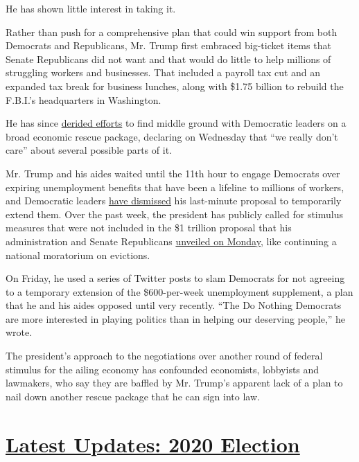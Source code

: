 He has shown little interest in taking it.

Rather than push for a comprehensive plan that could win support from
both Democrats and Republicans, Mr. Trump first embraced big-ticket
items that Senate Republicans did not want and that would do little to
help millions of struggling workers and businesses. That included a
payroll tax cut and an expanded tax break for business lunches, along
with \$1.75 billion to rebuild the F.B.I.'s headquarters in Washington.

He has since
\href{https://www.nytimes3xbfgragh.onion/2020/07/29/business/economy/virus-aid-trump.html?referringSource=articleShare}{derided
efforts} to find middle ground with Democratic leaders on a broad
economic rescue package, declaring on Wednesday that ``we really don't
care'' about several possible parts of it.

Mr. Trump and his aides waited until the 11th hour to engage Democrats
over expiring unemployment benefits that have been a lifeline to
millions of workers, and Democratic leaders
\href{https://www.nytimes3xbfgragh.onion/2020/07/30/us/politics/senate-virus-aid.html}{have
dismissed} his last-minute proposal to temporarily extend them. Over the
past week, the president has publicly called for stimulus measures that
were not included in the \$1 trillion proposal that his administration
and Senate Republicans
\href{https://www.nytimes3xbfgragh.onion/2020/07/27/us/politics/republicans-jobless-aid.html}{unveiled
on Monday}, like continuing a national moratorium on evictions.

On Friday, he used a series of Twitter posts to slam Democrats for not
agreeing to a temporary extension of the \$600-per-week unemployment
supplement, a plan that he and his aides opposed until very recently.
``The Do Nothing Democrats are more interested in playing politics than
in helping our deserving people,'' he wrote.

The president's approach to the negotiations over another round of
federal stimulus for the ailing economy has confounded economists,
lobbyists and lawmakers, who say they are baffled by Mr. Trump's
apparent lack of a plan to nail down another rescue package that he can
sign into law.

\hypertarget{latest-updates-2020-election}{%
\section{\texorpdfstring{\href{https://www.nytimes3xbfgragh.onion/2020/08/03/us/elections/biden-vs-trump.html?action=click\&pgtype=Article\&state=default\&region=MAIN_CONTENT_1\&context=storylines_live_updates}{Latest
Updates: 2020
Election}}{Latest Updates: 2020 Election}}\label{latest-updates-2020-election}}

